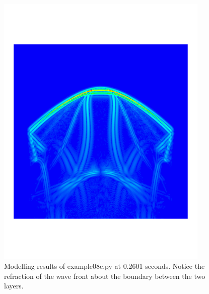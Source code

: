 \begin{figure}[ht]
\centering
\includegraphics[width=4in]{figures/ex08c2601.png}
\caption{Modelling results of example08c.py at 0.2601 seconds. Notice the
refraction of the wave front about the boundary between the two layers.}
\label{fig:ex08cres}
\end{figure}


